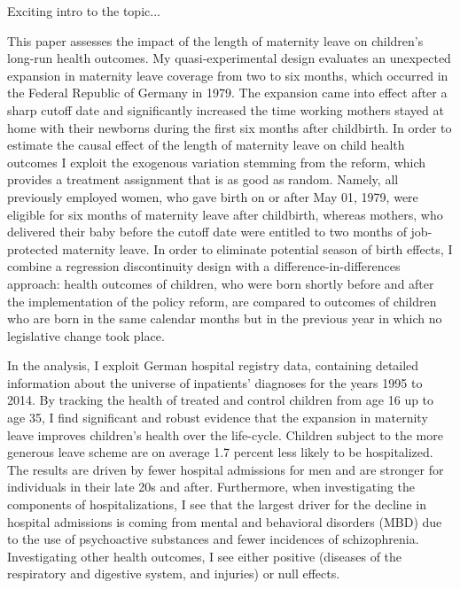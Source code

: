 \documentclass[11pt, a4paper,draft]{article} %
\begin{document}
Exciting intro to the topic...\newline

This paper assesses the impact of the length of maternity leave on children’s long-run health outcomes. My quasi-experimental design evaluates an unexpected expansion in maternity leave coverage from two to six months, which occurred in the Federal Republic of Germany in 1979. The expansion came into effect after a sharp cutoff date and significantly increased the time working mothers stayed at home with their newborns during the first six months after childbirth. In order to estimate the causal effect of the length of maternity leave on child health outcomes I exploit the exogenous variation stemming from the reform, which provides a treatment assignment that is as good as random. Namely, all previously employed women, who gave birth on or after May 01, 1979, were eligible for six months of maternity leave after childbirth, whereas mothers, who delivered their baby before the cutoff date were entitled to two months of job-protected maternity leave. In order to eliminate potential season of birth effects, I combine a regression discontinuity design with a difference-in-differences approach: health outcomes of children, who were born shortly before and after the implementation of the policy reform, are compared to outcomes of children who are born in the same calendar months but in the previous year in which no legislative change took place.\newline


In the analysis, I exploit German hospital registry data, containing detailed information about the universe of inpatients' diagnoses for the years 1995 to 2014. By tracking the health of treated and control children from age 16 up to age 35, I find significant and robust evidence that the expansion in maternity leave improves children's health over the life-cycle. Children subject to the more generous leave scheme are on average 1.7 percent less likely to be hospitalized. The results are driven by fewer hospital admissions for men and are stronger for individuals in their late 20s and after. Furthermore, when investigating the components of hospitalizations, I see that the largest driver for the decline in hospital admissions is coming from mental and behavioral disorders (MBD) due to the use of psychoactive substances and fewer incidences of schizophrenia. Investigating other health outcomes, I see either positive (diseases of the respiratory and digestive system, and injuries) or null effects. \newline
\end{document}
